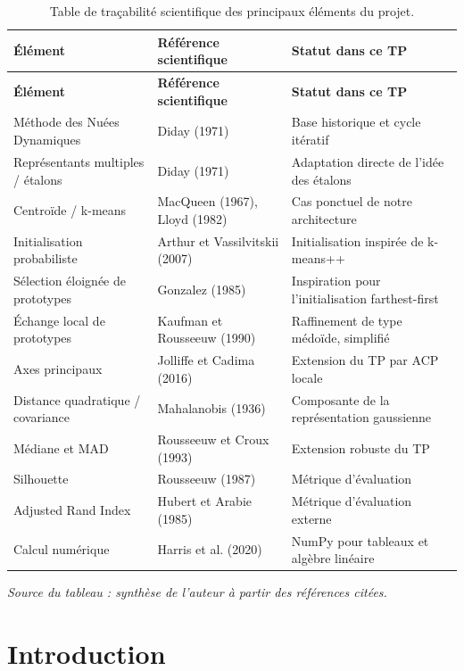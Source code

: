 \documentclass[12pt,a4paper]{article}
\begin{document}
\begin{longtable}{p{4.0cm}p{5.3cm}p{5.0cm}}
\caption{Table de traçabilité scientifique des principaux éléments du projet.}\\
\toprule
\textbf{Élément} & \textbf{Référence scientifique} & \textbf{Statut dans ce TP} \\
\midrule
\endfirsthead
\toprule
\textbf{Élément} & \textbf{Référence scientifique} & \textbf{Statut dans ce TP} \\
\midrule
\endhead
Méthode des Nuées Dynamiques & Diday (1971) \cite{diday1971} & Base historique et cycle itératif \\
Représentants multiples / étalons & Diday (1971) \cite[p.~25]{diday1971} & Adaptation directe de l'idée des étalons \\
Centroïde / k-means & MacQueen (1967), Lloyd (1982) \cite{macqueen1967,lloyd1982} & Cas ponctuel de notre architecture \\
Initialisation probabiliste & Arthur et Vassilvitskii (2007) \cite{arthur2007} & Initialisation inspirée de k-means++ \\
Sélection éloignée de prototypes & Gonzalez (1985) \cite{gonzalez1985} & Inspiration pour l'initialisation farthest-first \\
Échange local de prototypes & Kaufman et Rousseeuw (1990) \cite{kaufman1990} & Raffinement de type médoïde, simplifié \\
Axes principaux & Jolliffe et Cadima (2016) \cite{jolliffe2016} & Extension du TP par ACP locale \\
Distance quadratique / covariance & Mahalanobis (1936) \cite{mahalanobis1936} & Composante de la représentation gaussienne \\
Médiane et MAD & Rousseeuw et Croux (1993) \cite{rousseeuwcroux1993} & Extension robuste du TP \\
Silhouette & Rousseeuw (1987) \cite{rousseeuw1987} & Métrique d'évaluation \\
Adjusted Rand Index & Hubert et Arabie (1985) \cite{hubert1985} & Métrique d'évaluation externe \\
Calcul numérique & Harris et al. (2020) \cite{harris2020} & NumPy pour tableaux et algèbre linéaire \\
\bottomrule
\end{longtable}

\noindent\textit{Source du tableau : synthèse de l'auteur à partir des références citées.}

\section{Introduction}
\end{document}
